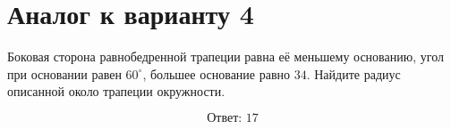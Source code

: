 \documentclass[12pt,a4paper]{article}
\begin{document}
\section*{Аналог к варианту 4}
Боковая сторона равнобедренной трапеции равна её меньшему основанию, угол при основании равен \(60^\circ\), большее основание равно \(34\). Найдите радиус описанной около трапеции окружности.
\begin{center}\figIsoscelesTrapezoidCircle\end{center}
\[\boxed{\text{Ответ: }17}\]
\end{document}
